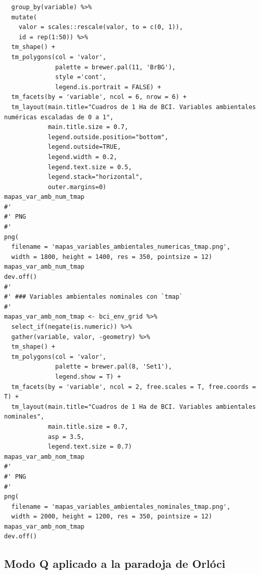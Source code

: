 \documentclass[11pt,]{article}
\begin{document}
\begin{verbatim}
  group_by(variable) %>% 
  mutate(
    valor = scales::rescale(valor, to = c(0, 1)),
    id = rep(1:50)) %>% 
  tm_shape() +
  tm_polygons(col = 'valor',
              palette = brewer.pal(11, 'BrBG'),
              style ='cont',
              legend.is.portrait = FALSE) +
  tm_facets(by = 'variable', ncol = 6, nrow = 6) +
  tm_layout(main.title="Cuadros de 1 Ha de BCI. Variables ambientales numéricas escaladas de 0 a 1",
            main.title.size = 0.7,
            legend.outside.position="bottom",
            legend.outside=TRUE,
            legend.width = 0.2,
            legend.text.size = 0.5,
            legend.stack="horizontal", 
            outer.margins=0)
mapas_var_amb_num_tmap
#'
#' PNG
#' 
png(
  filename = 'mapas_variables_ambientales_numericas_tmap.png',
  width = 1800, height = 1400, res = 350, pointsize = 12)
mapas_var_amb_num_tmap
dev.off()
#' 
#' ### Variables ambientales nominales con `tmap`
#' 
mapas_var_amb_nom_tmap <- bci_env_grid %>%
  select_if(negate(is.numeric)) %>% 
  gather(variable, valor, -geometry) %>% 
  tm_shape() +
  tm_polygons(col = 'valor',
              palette = brewer.pal(8, 'Set1'),
              legend.show = T) +
  tm_facets(by = 'variable', ncol = 2, free.scales = T, free.coords = T) +
  tm_layout(main.title="Cuadros de 1 Ha de BCI. Variables ambientales nominales",
            main.title.size = 0.7,
            asp = 3.5,
            legend.text.size = 0.7)
mapas_var_amb_nom_tmap
#'
#' PNG
#' 
png(
  filename = 'mapas_variables_ambientales_nominales_tmap.png',
  width = 2000, height = 1200, res = 350, pointsize = 12)
mapas_var_amb_nom_tmap
dev.off()
\end{verbatim}

\subsection{Modo Q aplicado a la paradoja de
Orlóci}\label{modo-q-aplicado-a-la-paradoja-de-orluxf3ci}
\end{document}

